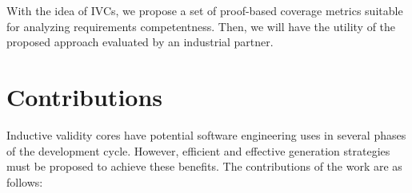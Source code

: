 With the idea of IVCs, we propose a set of proof-based coverage metrics suitable for analyzing requirements competentness. Then, we will have the utility of the proposed approach evaluated by an industrial partner.


\section{Contributions}
 Inductive validity cores have potential software engineering uses in several phases of the development cycle. However, efficient and effective generation strategies must be proposed to achieve these benefits. The contributions of the work are as follows:
